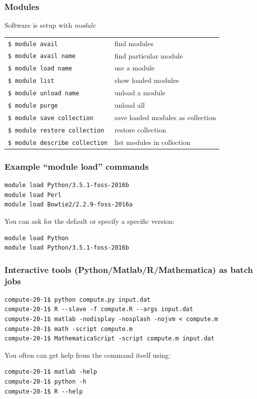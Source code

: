 \documentclass[10pt]{beamer}
\begin{document}
\begin{frame}[fragile]
\frametitle{Modules}

Software is setup with \it{module}

\begin{tabular}{|l|l|}
\hline
\verb+$ module avail + & find modules \\
\verb+$ module avail name+ & find particular module \\
\verb+$ module load name+ & use a module \\
\verb+$ module list+ & show loaded modules \\
\verb+$ module unload name+ & unload a module \\ 
\verb+$ module purge+ & unload all \\
\verb+$ module save collection + & save loaded modules as collection \\
\verb+$ module restore collection+ & restore collection \\
\verb+$ module describe collection+ & list modules in collection \\
\hline
\end{tabular}

\end{frame}

\begin{frame}[fragile]
\frametitle{Example ``module load'' commands}

\begin{verbatim}
module load Python/3.5.1-foss-2016b
module load Perl
module load Bowtie2/2.2.9-foss-2016a
\end{verbatim}

You can ask for the default or specify a specific version:
\begin{verbatim}
module load Python
module load Python/3.5.1-foss-2016b
\end{verbatim}

\end{frame}

\begin{frame}[fragile]
\frametitle{Interactive tools (Python/Matlab/R/Mathematica) as batch jobs}

\begin{verbatim}
compute-20-1$ python compute.py input.dat
compute-20-1$ R --slave -f compute.R --args input.dat
compute-20-1$ matlab -nodisplay -nosplash -nojvm < compute.m
compute-20-1$ math -script compute.m
compute-20-1$ MathematicaScript -script compute.m input.dat
\end{verbatim}

You often can get help from the command itself using:

\begin{verbatim}
compute-20-1$ matlab -help
compute-20-1$ python -h
compute-20-1$ R --help
\end{verbatim}
\end{frame}
\end{document}
